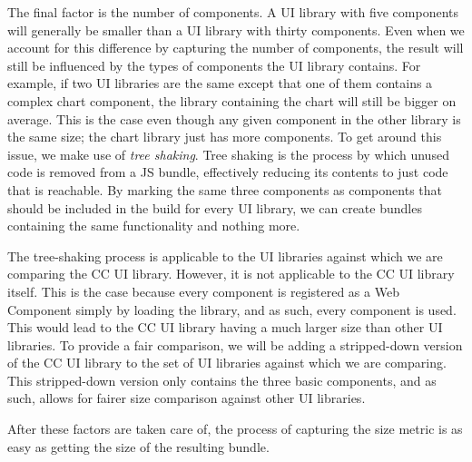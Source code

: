 The final factor is the number of components. A UI library with five components will generally be smaller than a UI library with thirty components. Even when we account for this difference by capturing the number of components, the result will still be influenced by the types of components the UI library contains. For example, if two UI libraries are the same except that one of them contains a complex chart component, the library containing the chart will still be bigger on average. This is the case even though any given component in the other library is the same size; the chart library just has more components. To get around this issue, we make use of \emph{tree shaking}. Tree shaking is the process by which unused code is removed from a JS bundle, effectively reducing its contents to just code that is reachable. By marking the same three components as components that should be included in the build for every UI library, we can create bundles containing the same functionality and nothing more.

The tree-shaking process is applicable to the UI libraries against which we are comparing the CC UI library. However, it is not applicable to the CC UI library itself. This is the case because every component is registered as a Web Component simply by loading the library, and as such, every component is used. This would lead to the CC UI library having a much larger size than other UI libraries. To provide a fair comparison, we will be adding a stripped-down version of the CC UI library to the set of UI libraries against which we are comparing. This stripped-down version only contains the three basic components, and as such, allows for fairer size comparison against other UI libraries.

After these factors are taken care of, the process of capturing the size metric is as easy as getting the size of the resulting bundle.


